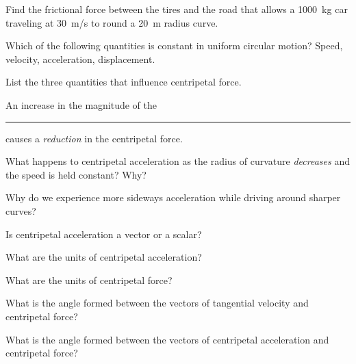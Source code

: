 \documentclass[main.tex]{subfiles}
\begin{document}
\begin{exercise} \label{MJm5VE}
    Find the frictional force between the tires and the road that allows a \SI{1000}{kg} car traveling at \SI{30}{m/s} to round a \SI{20}{m} radius curve.
\end{exercise}

\begin{exercise} \label{fsjtBV}
    Which of the following quantities is constant in uniform circular motion? Speed, velocity, acceleration, displacement.
\end{exercise}

\begin{exercise} \label{GD8Yff}
    List the three quantities that influence centripetal force.
\end{exercise}

\begin{exercise} \label{aEtlVz}
    An increase in the magnitude of the \rule{2cm}{0.15mm} causes a \textit{reduction} in the centripetal force.
\end{exercise}

\begin{exercise} \label{5lauZ6}
    What happens to centripetal acceleration as the radius of curvature \textit{decreases} and the speed is held constant? Why?
\end{exercise}

\begin{exercise} \label{KB7t4k}
    Why do we experience more sideways acceleration while driving around sharper curves?
\end{exercise}

\begin{exercise} \label{jb3iGO}
    Is centripetal acceleration a vector or a scalar?
\end{exercise}

\begin{exercise} \label{TUxTQh}
    What are the units of centripetal acceleration?
\end{exercise}

\begin{exercise} \label{9YKhPo}
    What are the units of centripetal force?
\end{exercise}

\begin{exercise} \label{wS6Htw}
    What is the angle formed between the vectors of tangential velocity and centripetal force?
\end{exercise}

\begin{exercise} \label{barV9C}
    What is the angle formed between the vectors of centripetal acceleration and centripetal force?
\end{exercise}
\end{document}
